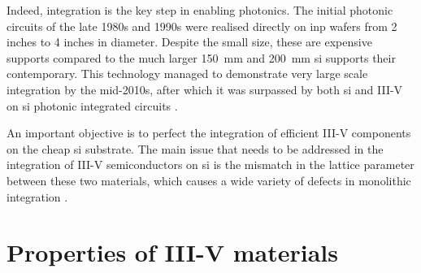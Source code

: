 Indeed, integration is the key step in enabling photonics. The initial photonic circuits of the late 1980s and 1990s were realised directly on \acf{inp} wafers from \num{2} inches to \num{4} inches in diameter. Despite the small size, these are expensive supports compared to the much larger \qty{150}{\milli\metre} and \qty{200}{\milli\metre} \acl{si} supports their contemporary. This technology managed to demonstrate very large scale integration by the mid-2010s, after which it was surpassed by both \acl{si} and III-V on \acl{si} photonic integrated circuits \cite{Shekhar2024, Margalit2021}.

An important objective is to perfect the integration of efficient III-V components on the cheap \acl{si} substrate. The main issue that needs to be addressed in the integration of III-V semiconductors on \acl{si} is the mismatch in the lattice parameter between these two materials, which causes a wide variety of defects in monolithic integration \cite{Kunert2018}. 

\section{Properties of III-V materials}

